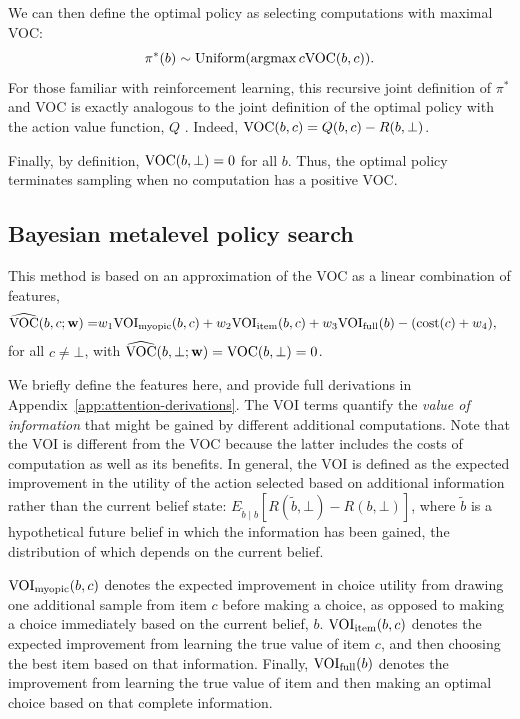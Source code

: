 We can then define the optimal policy as selecting computations with maximal VOC:
$$
\pi^*(b) \sim \text{Uniform}(\operatorname*{argmax}{c} \text{VOC}(b, c)).
$$
For those familiar with reinforcement learning, this recursive joint definition of $\pi^*$ and VOC is exactly analogous to the joint definition of the optimal policy with the action value function, $Q$ \citep{sutton2018reinforcement}. Indeed, $\text{VOC}(b, c) = Q(b, c) - R(b, \bot)$. 

Finally, by definition, $\text{VOC}(b,\bot)=0$ for all $b$. Thus, the optimal policy terminates sampling when no computation has a positive VOC.

\subsection{Bayesian metalevel policy search}\label{sec:BMPS}

This method is based on an approximation of the VOC as a linear combination of features,
\begin{equation}\label{eq:vochat}
  \begin{aligned}
    \widehat{\text{VOC}}(b, c; \mathbf{w}) =& w_{1}\text{VOI}_\text{myopic}(b,c)+w_{2}\text{VOI}_\text{item}(b,c) +
     w_{3}\text{VOI}_\text{full}(b) -(\text{cost}(c)+w_{4}),
  \end{aligned}
\end{equation}
for all $c\neq\bot$, with $\widehat{\text{VOC}}(b, \bot; \mathbf{w}) = \text{VOC}(b,\bot)=0$.

We briefly define the features here, and provide full derivations in Appendix~\ref{app:attention-derivations}. The VOI terms quantify the \textit{value of information} \citep{howard1966information} that might be gained by different additional computations. Note that the VOI is different from the VOC because the latter includes the costs of computation as well as its benefits. In general, the VOI is defined as the expected improvement in the utility of the action selected based on additional information rather than the current belief state: $E_{\tilde{b} \mid b}[R(\tilde{b}, \bot) - R(b, \bot)]$, where $\tilde{b}$ is a hypothetical future belief in which the information has been gained, the distribution of which depends on the current belief.

$\text{VOI}_\text{myopic}(b,c)$ denotes the expected improvement in choice utility from drawing one additional sample from item $c$ before making a choice, as opposed to making a choice immediately based on the current belief, $b$. $\text{VOI}_\text{item}(b,c)$ denotes the expected improvement from learning the true value of item $c$, and then choosing the best item based on that information. Finally, $\text{VOI}_\text{full}(b)$ denotes the improvement from learning the true value of  item and then making an optimal choice based on that complete information.

